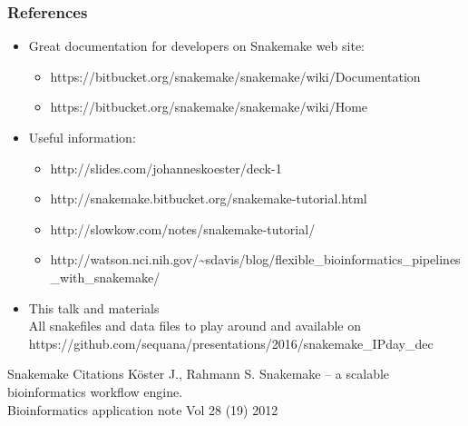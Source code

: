 \documentclass{beamer}
\begin{document}
\begin{frame}
    \frametitle{References}
    \begin{itemize}
        \item Great documentation for developers on Snakemake web site:
        \begin{itemize}
	    \item {\tiny https://bitbucket.org/snakemake/snakemake/wiki/Documentation}
            \item {\tiny https://bitbucket.org/snakemake/snakemake/wiki/Home}
        \end{itemize}        
        \item Useful information:
        \begin{itemize}
            \item {\tiny http://slides.com/johanneskoester/deck-1}
            \item {\tiny http://snakemake.bitbucket.org/snakemake-tutorial.html}
            \item {\tiny http://slowkow.com/notes/snakemake-tutorial/}
            \item {\tiny http://watson.nci.nih.gov/{\textasciitilde{}}sdavis/blog/flexible\_bioinformatics\_pipelines\_with\_snakemake/}
        \end{itemize}
        \item This talk and materials
        \\
        {\normalsize All snakefiles and data files to play 
	  around and available on
        {\tiny https://github.com/sequana/presentations/2016/snakemake\_IPday\_dec}       
        }
    \end{itemize}
    
    \begin{block}{Snakemake Citations}
    {\tiny 
    K\"oster J., Rahmann S. 
    Snakemake -- a scalable bioinformatics workflow engine.    \\
    Bioinformatics application note  Vol 28 (19) 2012 }
    \end{block}
  
        
\end{frame}




\end{document}
